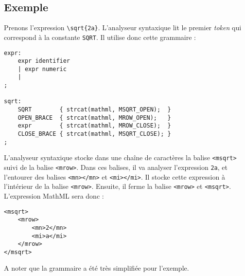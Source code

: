\documentclass{article}
\begin{document}
\subsection*{Exemple}
Prenons l'expression \verb|\sqrt{2a}|. L'analyseur syntaxique lit le premier \textit{token} qui correspond à la constante \verb|SQRT|. Il utilise donc cette grammaire :
\begin{verbatim}
expr:
    expr identifier
    | expr numeric
    |
;

sqrt:
    SQRT        { strcat(mathml, MSQRT_OPEN);  }
    OPEN_BRACE  { strcat(mathml, MROW_OPEN);   }
    expr        { strcat(mathml, MROW_CLOSE);  }
    CLOSE_BRACE { strcat(mathml, MSQRT_CLOSE); }
;
\end{verbatim}
L'analyseur syntaxique stocke dans une chaîne de caractères la balise \verb|<msqrt>| suivi de la balise \verb|<mrow>|. Dans ces balises, il va analyser l'expression \verb|2a|, et l'entourer des balises \verb|<mn></mn>| et \verb|<mi></mi>|. Il stocke cette expression à l'intérieur de la balise \verb|<mrow>|. Ensuite, il ferme la balise \verb|<mrow>| et \verb|<msqrt>|. L'expression MathML sera donc :
\begin{verbatim}
<msqrt>
    <mrow>
        <mn>2</mn>
        <mi>a</mi>
    </mrow>
</msqrt>
\end{verbatim}
A noter que la grammaire a été très simplifiée pour l'exemple.
\end{document}
